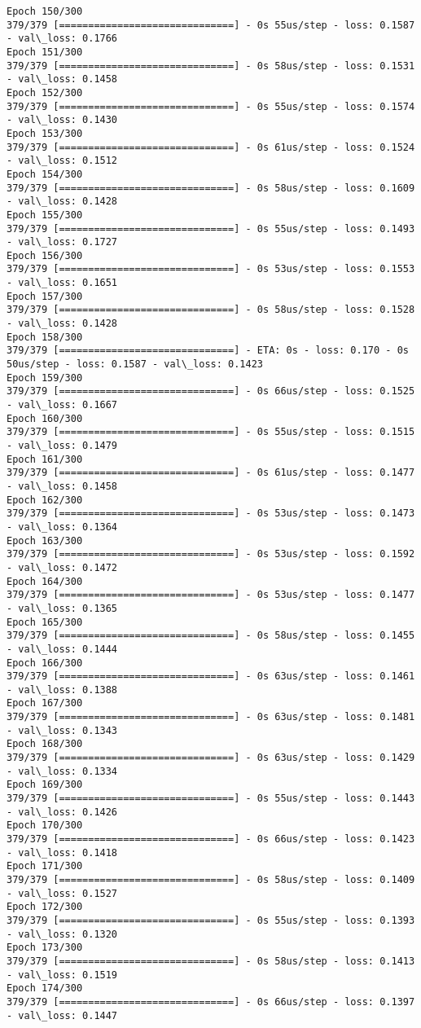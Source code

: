 \documentclass[11pt]{article}
\begin{document}
\begin{Verbatim}[commandchars=\\\{\}]
Epoch 150/300
379/379 [==============================] - 0s 55us/step - loss: 0.1587 - val\_loss: 0.1766
Epoch 151/300
379/379 [==============================] - 0s 58us/step - loss: 0.1531 - val\_loss: 0.1458
Epoch 152/300
379/379 [==============================] - 0s 55us/step - loss: 0.1574 - val\_loss: 0.1430
Epoch 153/300
379/379 [==============================] - 0s 61us/step - loss: 0.1524 - val\_loss: 0.1512
Epoch 154/300
379/379 [==============================] - 0s 58us/step - loss: 0.1609 - val\_loss: 0.1428
Epoch 155/300
379/379 [==============================] - 0s 55us/step - loss: 0.1493 - val\_loss: 0.1727
Epoch 156/300
379/379 [==============================] - 0s 53us/step - loss: 0.1553 - val\_loss: 0.1651
Epoch 157/300
379/379 [==============================] - 0s 58us/step - loss: 0.1528 - val\_loss: 0.1428
Epoch 158/300
379/379 [==============================] - ETA: 0s - loss: 0.170 - 0s 50us/step - loss: 0.1587 - val\_loss: 0.1423
Epoch 159/300
379/379 [==============================] - 0s 66us/step - loss: 0.1525 - val\_loss: 0.1667
Epoch 160/300
379/379 [==============================] - 0s 55us/step - loss: 0.1515 - val\_loss: 0.1479
Epoch 161/300
379/379 [==============================] - 0s 61us/step - loss: 0.1477 - val\_loss: 0.1458
Epoch 162/300
379/379 [==============================] - 0s 53us/step - loss: 0.1473 - val\_loss: 0.1364
Epoch 163/300
379/379 [==============================] - 0s 53us/step - loss: 0.1592 - val\_loss: 0.1472
Epoch 164/300
379/379 [==============================] - 0s 53us/step - loss: 0.1477 - val\_loss: 0.1365
Epoch 165/300
379/379 [==============================] - 0s 58us/step - loss: 0.1455 - val\_loss: 0.1444
Epoch 166/300
379/379 [==============================] - 0s 63us/step - loss: 0.1461 - val\_loss: 0.1388
Epoch 167/300
379/379 [==============================] - 0s 63us/step - loss: 0.1481 - val\_loss: 0.1343
Epoch 168/300
379/379 [==============================] - 0s 63us/step - loss: 0.1429 - val\_loss: 0.1334
Epoch 169/300
379/379 [==============================] - 0s 55us/step - loss: 0.1443 - val\_loss: 0.1426
Epoch 170/300
379/379 [==============================] - 0s 66us/step - loss: 0.1423 - val\_loss: 0.1418
Epoch 171/300
379/379 [==============================] - 0s 58us/step - loss: 0.1409 - val\_loss: 0.1527
Epoch 172/300
379/379 [==============================] - 0s 55us/step - loss: 0.1393 - val\_loss: 0.1320
Epoch 173/300
379/379 [==============================] - 0s 58us/step - loss: 0.1413 - val\_loss: 0.1519
Epoch 174/300
379/379 [==============================] - 0s 66us/step - loss: 0.1397 - val\_loss: 0.1447

\end{Verbatim}
\end{document}
